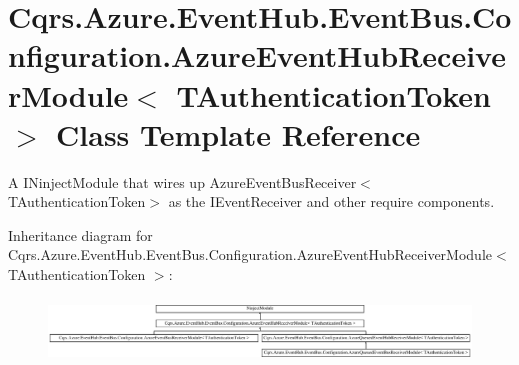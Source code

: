 \hypertarget{classCqrs_1_1Azure_1_1EventHub_1_1EventBus_1_1Configuration_1_1AzureEventHubReceiverModule}{}\section{Cqrs.\+Azure.\+Event\+Hub.\+Event\+Bus.\+Configuration.\+Azure\+Event\+Hub\+Receiver\+Module$<$ T\+Authentication\+Token $>$ Class Template Reference}
\label{classCqrs_1_1Azure_1_1EventHub_1_1EventBus_1_1Configuration_1_1AzureEventHubReceiverModule}


A I\+Ninject\+Module that wires up Azure\+Event\+Bus\+Receiver$<$\+T\+Authentication\+Token$>$ as the I\+Event\+Receiver and other require components.  


Inheritance diagram for Cqrs.\+Azure.\+Event\+Hub.\+Event\+Bus.\+Configuration.\+Azure\+Event\+Hub\+Receiver\+Module$<$ T\+Authentication\+Token $>$\+:\begin{figure}[H]
\begin{center}
\leavevmode
\includegraphics[height=1.707317cm]{classCqrs_1_1Azure_1_1EventHub_1_1EventBus_1_1Configuration_1_1AzureEventHubReceiverModule}
\end{center}
\end{figure}
